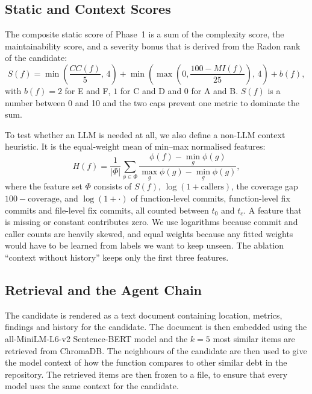 \documentclass[12pt,onecolumn,draftclsnofoot]{IEEEtran}
\begin{document}
\subsection{Static and Context Scores}

The composite static score of Phase~1 is a sum of the complexity score, the maintainability score, and a severity bonus that is derived from the Radon rank of the candidate:
\begin{equation}
S(f)=\min\!\left(\frac{CC(f)}{5},\,4\right)+\min\!\left(\max\!\left(0,\frac{100-MI(f)}{25}\right),\,4\right)+b(f),
\label{eq:static}
\end{equation}
with $b(f)=2$ for E and F, $1$ for C and D and $0$ for A and B. $S(f)$ is a number between 0 and 10 and the two caps prevent one metric to dominate the sum.

To test whether an LLM is needed at all, we also define a non-LLM context heuristic. It is the equal-weight mean of min--max normalised features:
\begin{equation}
H(f)=\frac{1}{|\Phi|}\sum_{\phi\in\Phi}\frac{\phi(f)-\min_{g}\phi(g)}{\max_{g}\phi(g)-\min_{g}\phi(g)},
\label{eq:heur}
\end{equation}
where the feature set $\Phi$ consists of $S(f)$, $\log(1+\text{callers})$, the coverage gap $100-\text{coverage}$, and $\log(1+\cdot)$ of function-level commits, function-level fix commits and file-level fix commits, all counted between $t_0$ and $t_c$. A feature that is missing or constant contributes zero. We use logarithms because commit and caller counts are heavily skewed, and equal weights because any fitted weights would have to be learned from labels we want to keep unseen. The ablation ``context without history'' keeps only the first three features.

\subsection{Retrieval and the Agent Chain}

The candidate is rendered as a text document containing location, metrics, findings and history for the candidate. The document is then embedded using the all-MiniLM-L6-v2 Sentence-BERT model \cite{reimers2019} and the $k=5$ most similar items are retrieved from ChromaDB. The neighbours of the candidate are then used to give the model context of how the function compares to other similar debt in the repository. The retrieved items are then frozen to a file, to ensure that every model uses the same context for the candidate.
\end{document}
